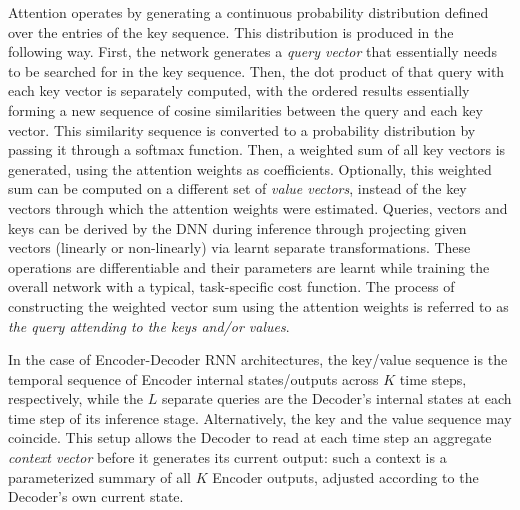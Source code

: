 \documentclass[preprint,review,10pt]{elsarticle}
\begin{document}
	Attention operates by generating a continuous probability distribution defined over the entries of the key sequence. This distribution is produced in the following way. First, the network generates a \textit{query vector} that essentially needs to be searched for in the key sequence. Then, the dot product of that query with each key vector is separately computed, with the ordered results essentially forming a new sequence of cosine similarities between the query and each key vector. This similarity sequence is converted to a probability distribution by passing it through a softmax function. Then, a weighted sum of all key vectors is generated, using the attention weights as coefficients. Optionally, this weighted sum can be computed on a different set of \textit{value vectors}, instead of the key vectors through which the attention weights were estimated. Queries, vectors and keys can be derived by the DNN during inference through projecting given vectors (linearly or non-linearly) via learnt separate transformations. These operations are differentiable and their parameters are learnt while training the overall network with a typical, task-specific cost function. The process of constructing the weighted vector sum using the attention weights is referred to as \textit{the query attending to the keys and/or values}.
	
	In the case of Encoder-Decoder RNN architectures, the key/value sequence is the temporal sequence of Encoder internal states/outputs across $K$ time steps, respectively, while the $L$ separate queries are the Decoder's internal states at each time step of its inference stage. Alternatively, the key and the value sequence may coincide. This setup allows the Decoder to read at each time step an aggregate \textit{context vector} before it generates its current output: such a context is a parameterized summary of all $K$ Encoder outputs, adjusted according to the Decoder's own current state.
	
\end{document}
